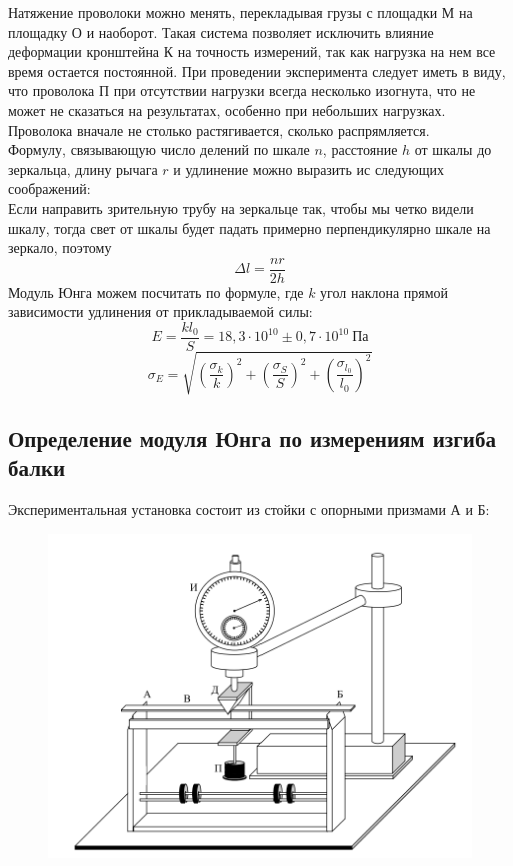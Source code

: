 \documentclass[a4paper,12pt]{article} %
\begin{document}
    Натяжение проволоки можно менять, перекладывая грузы с площадки М на площадку О и наоборот. Такая система позволяет исключить влияние деформации кронштейна К на точность измерений, так как нагрузка на нем все время остается постоянной.
    При проведении эксперимента следует иметь в виду, что проволока П при отсутствии нагрузки всегда несколько изогнута, что не может не сказаться на результатах, особенно при небольших нагрузках. Проволока вначале не столько растягивается, сколько распрямляется.\\
    Формулу, связывающую число делений по шкале $n$, расстояние $h$ от шкалы до зеркальца, длину рычага $r$ и удлинение можно выразить ис следующих соображений:\\
    Если направить зрительную трубу на зеркальце так, чтобы мы четко видели шкалу, тогда свет от шкалы будет падать примерно перпендикулярно шкале на зеркало, поэтому
    \[
        \Delta l =\dfrac{nr}{2h}
    \]
    Модуль Юнга можем посчитать по формуле, где $k$ угол наклона прямой зависимости удлинения от прикладываемой силы:
    \[
        E = \frac{kl_0}{S} = 18,3 \cdot 10^{10} \pm 0,7 \cdot 10^{10}~ \text{Па}
    \]
    \begin{equation}
        \sigma_E = \sqrt{\left( \dfrac{\sigma_{k}}{k} \right)^2 + \left( \dfrac{\sigma_{S}}{S} \right)^2 + \left( \dfrac{\sigma_{l_0}}{l_0} \right)^2 }
    \end{equation}

    \subsection{Определение модуля Юнга по измерениям изгиба балки}
    
    Экспериментальная установка состоит из стойки с опорными призмами А и Б:
    
    \begin{figure}[H]
        \centering
        \includegraphics[height=0.4\textheight]{images/2.png}
    \end{figure}
    
\end{document}
